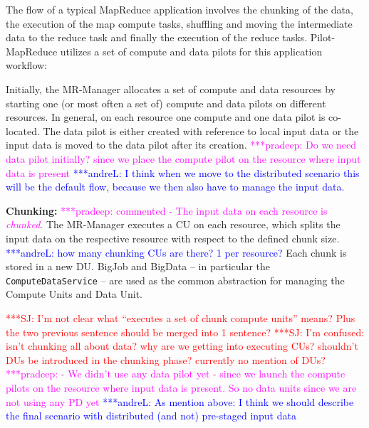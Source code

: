 \documentclass{acm_proc_article-sp}
\newcommand{\jhanote}[1]{ {\textcolor{red} { ***SJ: #1 }}}
\newcommand{\alnote}[1]{ {\textcolor{blue} { ***andreL: #1 }}}
\newcommand{\pnote}[1]{ {\textcolor{magenta} { ***pradeep: #1 }}}
\newcommand{\alnote}[1]{}
\newcommand{\pnote}[1]{}
\newcommand{\jhanote}[1]{}
\newcommand{\pilotmapreduce}{Pilot-MapReduce\xspace}
\newcommand{\mrmg}{MR-Manager\xspace}
\newcommand{\computeunits}{Compute Units\xspace}
\newcommand{\cu}{CU\xspace}
\newcommand{\dataunits}{Data Unit\xspace}
\begin{document}
The flow of a typical MapReduce application involves the chunking of
the data, the execution of the map compute tasks, shuffling and moving
the intermediate data to the reduce task and finally the execution of
the reduce tasks.  \pilotmapreduce utilizes a set of compute and data
pilots for this application workflow: %
\begin{compactenum}[A.]
\item Initially, the \mrmg allocates a set of compute and data
  resources by starting one (or most often a set of) compute and data
  pilots on different resources.  In general, on each resource one
  compute and one data pilot is co-located. The data pilot is either
  created with reference to local input data or the input data is
  moved to the data pilot after its creation.
\pnote{Do we need data pilot initially? since we place the compute pilot on the
resource where input data is present} \alnote{I think when we move to the
distributed scenario this will be the default flow, because we then also have to
manage the input data.}

\item \textbf{Chunking:} \pnote{commented - The input data on each resource is
{\it chunked}.} The \mrmg executes a \cu on each resource, which splits the
input data on the respective resource with respect to the defined chunk
size.\label{stp:chunking} \alnote{how many chunking CUs are there? 1 per
resource?} Each chunk is stored in a new DU. BigJob and BigData -- in particular
the \texttt{ComputeDataService} -- are used as the common abstraction for
managing the \computeunits and \dataunits.
  
  \jhanote{I'm not clear what ``executes a set of chunk compute
    units'' means? Plus the two previous sentence should be merged
    into 1 sentence?} \jhanote{I'm confused: isn't chunking all about
    data? why are we getting into executing CUs? shouldn't DUs be
    introduced in the chunking phase? currently no mention of DUs?}
\pnote{ - We didn't use any data pilot yet - since we launch the compute pilots 
on the resource where input data is present. So no data units since we are not 
using any PD yet} \alnote{As mention above: I think we should describe the final 
scenario with distributed (and not) pre-staged input data}


\end{compactenum}
\end{document}
